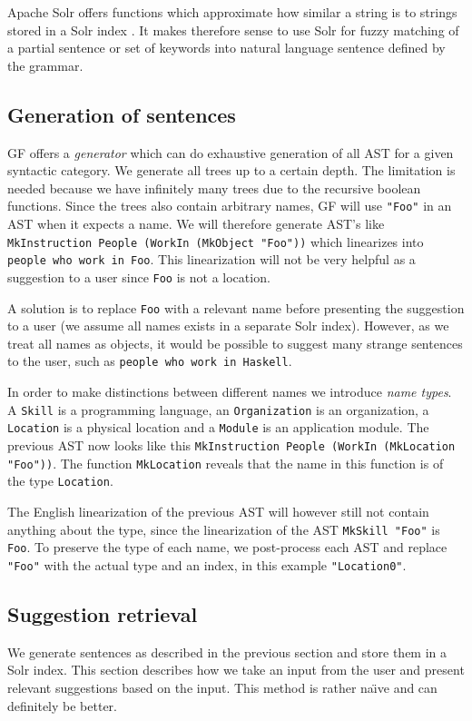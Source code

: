 \documentclass[10pt, a4paper]{article}
\begin{document}
Apache Solr offers functions which approximate how similar a string 
is to strings stored in a Solr index \cite{kuc:2011}. 
It makes therefore sense to use Solr for fuzzy matching of 
a partial sentence or set of keywords into natural language sentence
defined by the grammar.

\subsection{Generation of sentences}
GF offers a \emph{generator} which can do exhaustive generation of
all AST for a given syntactic category. We generate all trees up to 
a certain depth. The limitation is needed because we have infinitely 
many trees due to the recursive boolean functions. Since the trees also
contain arbitrary names, GF will use  \texttt{"Foo"} in an AST 
when it expects a name. We will therefore generate AST's like 
\texttt{MkInstruction People (WorkIn (MkObject "Foo"))} which linearizes 
into \texttt{people who work in Foo}. This linearization will not 
be very helpful as a suggestion to a user since \texttt{Foo} is not a location.

A solution is to replace \texttt{Foo} with a relevant name 
before presenting the suggestion to a user (we assume all names exists 
in a separate Solr index). However, as we treat all names as objects, 
it would be possible to suggest many strange sentences to the user, such as \texttt{people who work in Haskell}.

In order to make distinctions between different names we introduce \emph{name types}. A \texttt{Skill} is a programming language, an \texttt{Organization} is an organization, a \texttt{Location} is a physical location and a \texttt{Module} is an application module. The previous AST now looks like this \texttt{MkInstruction People (WorkIn (MkLocation "Foo"))}. The function \texttt{MkLocation} reveals that the name in this function is of the type \texttt{Location}. 

The English linearization of the previous AST will however still not contain anything about the type, since the linearization of the AST \texttt{MkSkill "Foo"} is \texttt{Foo}. To preserve the type of each name, we post-process each AST and replace \texttt{"Foo"} with the actual type and an index, in this example \texttt{"Location0"}.

\subsection{Suggestion retrieval}
 We generate sentences as described in the previous section and store them in a Solr index. This section describes how we take an input from the user and present relevant suggestions based on the input. This method is rather na\"{\i}ve and can definitely be better.
\end{document}
